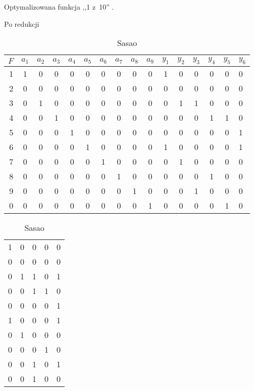 \begin{table}[H]
\caption{Optymalizowana funkcja ,,1 z~10'' \cite{sasao-s-min}.}
\begin{subtable}{.64\linewidth}
\caption{Po redukcji}
\label{1of10-reduct}

\begin{tabular}{|r|c@{}c@{}c@{}c@{}c@{}c@{}c@{}c@{}c|c@{}c@{}c@{}c@{}c@{}l|}
\hline
$F$ & $a_1$ & $a_2$ & $a_3$ & $a_4$ & $a_5$ & $a_6$ & $a_7$ & $a_8$ & $a_9$ & $y_1$ & $y_2$ & $y_3$ & $y_4$ & $y_5$ & $y_6$ \\
\hline
1 & 1 & 0 & 0 & 0 & 0 & 0 & 0 & 0 & 0 & 1 & 0 & 0 & 0 & 0 & 0 \\
2 & 0 & 0 & 0 & 0 & 0 & 0 & 0 & 0 & 0 & 0 & 0 & 0 & 0 & 0 & 0 \\
3 & 0 & 1 & 0 & 0 & 0 & 0 & 0 & 0 & 0 & 0 & 1 & 1 & 0 & 0 & 0 \\
4 & 0 & 0 & 1 & 0 & 0 & 0 & 0 & 0 & 0 & 0 & 0 & 0 & 1 & 1 & 0 \\
5 & 0 & 0 & 0 & 1 & 0 & 0 & 0 & 0 & 0 & 0 & 0 & 0 & 0 & 0 & 1 \\
6 & 0 & 0 & 0 & 0 & 1 & 0 & 0 & 0 & 0 & 1 & 0 & 0 & 0 & 0 & 1 \\
7 & 0 & 0 & 0 & 0 & 0 & 1 & 0 & 0 & 0 & 0 & 1 & 0 & 0 & 0 & 0 \\
8 & 0 & 0 & 0 & 0 & 0 & 0 & 1 & 0 & 0 & 0 & 0 & 0 & 1 & 0 & 0 \\
9 & 0 & 0 & 0 & 0 & 0 & 0 & 0 & 1 & 0 & 0 & 0 & 1 & 0 & 0 & 0 \\
0 & 0 & 0 & 0 & 0 & 0 & 0 & 0 & 0 & 1 & 0 & 0 & 0 & 0 & 1 & 0 \\
\hline
\end{tabular}

\end{subtable}
\begin{subtable}{.12\linewidth}
\caption{Sasao}
\label{1of10-reduct-b}

\begin{tabular}{|r@{}c@{}c@{}c@{}l|}
\hline
  &   &   &   &   \\
\hline
1 & 0 & 0 & 0 & 0 \\
0 & 0 & 0 & 0 & 0 \\
0 & 1 & 1 & 0 & 1 \\
0 & 0 & 1 & 1 & 0 \\
0 & 0 & 0 & 0 & 1 \\
1 & 0 & 0 & 0 & 1 \\
0 & 1 & 0 & 0 & 0 \\
0 & 0 & 0 & 1 & 0 \\
0 & 0 & 1 & 0 & 1 \\
0 & 0 & 1 & 0 & 0 \\
\hline
\end{tabular}


\end{subtable}
\end{table}
